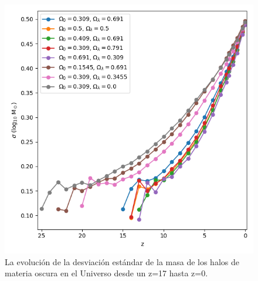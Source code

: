 \documentclass{beamer}
\begin{document}
\begin{frame}
\begin{columns}[t]
			\begin{column}{.5\textwidth}
				\begin{figure}
					\centering
					\includegraphics[scale=0.28]{Conc/MassStd_Conc.png}
					\caption{\footnotesize La evolución de la desviación estándar de la masa de los halos de materia oscura en el Universo desde un z=17 hasta z=0.}
					\label{fig:Conc-MassStd}
				\end{figure}
			\end{column}
		\end{columns}

	\end{frame}	
\end{document}
